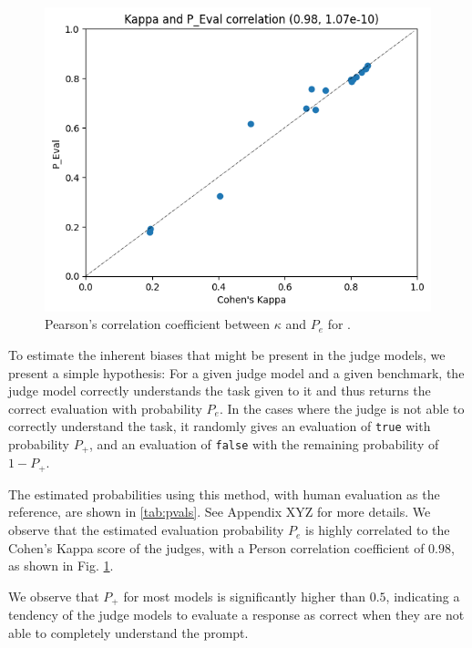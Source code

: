 \begin{figure}[!htbp]
\begin{minipage}{0.45\textwidth}
  
\end{minipage}%
\hspace{1cm}
\begin{minipage}{0.45\textwidth}
  \centering
  \includegraphics[width=\linewidth]{figures/eval-quality-kappa-correlation.png}
  \caption{Pearson's correlation coefficient between $\kappa$ and $P_e$ for \judgemodels.}
  \label{fig:k-p-corr}
\end{minipage}
\end{figure}


 

To estimate the inherent biases that might be present in the judge models, we present a simple hypothesis: For a given judge model and a given benchmark, the judge model correctly understands the task given to it and thus returns the correct evaluation with probability $P_e$. In the cases where the judge is not able to correctly understand the task, it randomly gives an evaluation of \texttt{true} with probability $P_+$, and an evaluation of \texttt{false} with the remaining probability of $1-P_+$.

The estimated probabilities using this method, with human evaluation as the reference, are shown in \cref{tab:pvals}. See Appendix XYZ for more details. We observe that the estimated evaluation probability $P_e$ is highly correlated to the Cohen's Kappa score of the judges, with a Person correlation coefficient of $0.98$, as shown in Fig. \cref{fig:k-p-corr}.

We observe that $P_+$ for most models is significantly higher than $0.5$, indicating a tendency of the judge models to evaluate a response as correct when they are not able to completely understand the prompt. 

 
